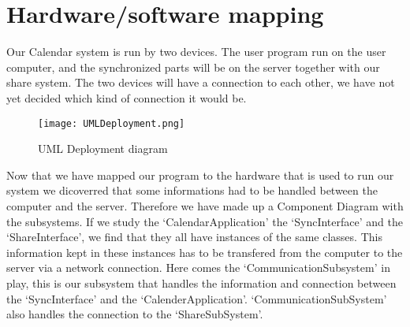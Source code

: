 \section{Hardware/software mapping}

Our Calendar system is run by two devices. The user program run on the user computer, and the synchronized parts will be on the server together with our share system. The two devices will have a connection to each other, we have not yet decided which kind of connection it would be.

\begin{figure}[h]
\centering
\texttt{[image: UMLDeployment.png]}
\caption{UML Deployment diagram \label{overflow}}
\label{figur:UMLDeployment}
\end{figure}

Now that we have mapped our program to the hardware that is used to run our system we dicoverred that some informations had to be handled between the computer and the server. Therefore we have made up a Component Diagram with the subsystems. If we study the ‘CalendarApplication’ the ‘SyncInterface’ and the ‘ShareInterface’, we find that they all have instances of the same classes. This information kept in these instances has to be transfered from the computer to the server via a network connection. Here comes the ‘CommunicationSubsystem’ in play, this is our subsystem that handles the information and connection between the ‘SyncInterface’ and the ‘CalenderApplication’. ‘CommunicationSubSystem’ also handles the connection to the ‘ShareSubSystem’.